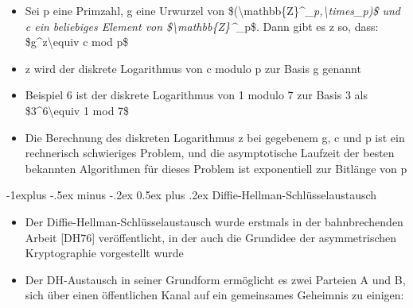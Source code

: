 \documentclass[a4paper]{article}
\makeatletter
\renewcommand{\subsection}{\@startsection{subsection}{2}{0mm}%
 {-1explus -.5ex minus -.2ex}%
 {0.5ex plus .2ex}%
 {\normalfont\normalsize\bfseries}}
\makeatother
\begin{document}
\begin{multicols}{3}
\begin{itemize}
              \begin{itemize}
                  \item
                        Sei p eine Primzahl, g eine Urwurzel von
                        \$(\textbackslash mathbb\{Z\}\^{}\emph{\_p,\textbackslash times\_p)\$
                        und c ein beliebiges Element von
                        \$\textbackslash mathbb\{Z\}\^{}}\_p\$. Dann gibt es z so, dass:
                        \$g\^{}z\textbackslash equiv c mod p\$
                  \item
                        z wird der diskrete Logarithmus von c modulo p zur Basis g genannt
                  \item
                        Beispiel 6 ist der diskrete Logarithmus von 1 modulo 7 zur Basis 3
                        als \$3\^{}6\textbackslash equiv 1 mod 7\$
                  \item
                        Die Berechnung des diskreten Logarithmus z bei gegebenem g, c und p
                        ist ein rechnerisch schwieriges Problem, und die asymptotische
                        Laufzeit der besten bekannten Algorithmen für dieses Problem ist
                        exponentiell zur Bitlänge von p
              \end{itemize}
    \end{itemize}


    \subsection{Diffie-Hellman-Schlüsselaustausch}

    \begin{itemize}
        \item
              Der Diffie-Hellman-Schlüsselaustausch wurde erstmals in der
              bahnbrechenden Arbeit {[}DH76{]} veröffentlicht, in der auch die
              Grundidee der asymmetrischen Kryptographie vorgestellt wurde
        \item
              Der DH-Austausch in seiner Grundform ermöglicht es zwei Parteien A und
              B, sich über einen öffentlichen Kanal auf ein gemeinsames Geheimnis zu
              einigen:


\end{itemize}
\end{multicols}
\end{document}
